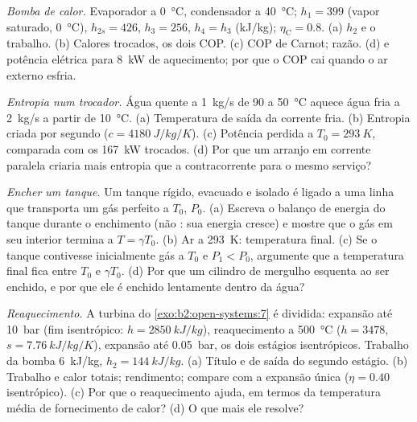 \begin{exercise}[$\star\star$]\label{exo:b2:open-systems:8}
\emph{Bomba de calor.} Evaporador a \qty{0}{\celsius}, condensador a \qty{40}{\celsius};
$h_1 = 399$ (vapor saturado, \qty{0}{\celsius}), $h_{2s} = 426$, $h_3 = 256$,
$h_4 = h_3$ (\unit{kJ/kg}); $\eta_{\text{C}} = 0.8$. (a) $h_2$ e o trabalho.
(b) Calores trocados, os dois COP. (c) COP de Carnot; razão. (d) 
e potência elétrica para \qty{8}{kW} de aquecimento; por que o COP cai quando
o ar externo esfria.
\end{exercise}

\begin{exercise}[$\star\star$]\label{exo:b2:open-systems:9}
\emph{Entropia num trocador.} Água quente a \qty{1}{kg/s} de \qty{90}{} a
\qty{50}{\celsius} aquece água fria a \qty{2}{kg/s} a partir de \qty{10}{\celsius}.
(a) Temperatura de saída da corrente fria. (b) Entropia criada por
segundo ($c = \qty{4180}{J/kg/K}$). (c) Potência perdida a $T_0 = \qty{293}{K}$,
comparada com os \qty{167}{kW} trocados. (d) Por que um arranjo em
corrente paralela criaria mais entropia que a contracorrente para o mesmo serviço?
\end{exercise}

\begin{exercise}[$\star\star\star$]\label{exo:b2:open-systems:10}
\emph{Encher um tanque.} Um tanque rígido, evacuado e isolado é ligado
a uma linha que transporta um gás perfeito a $T_0$, $P_0$. (a) Escreva o balanço
de energia do tanque durante o enchimento (não : sua energia cresce) e
mostre que o gás em seu interior termina a $T = \gamma T_0$. (b) Ar a \qty{293}{K}:
temperatura final. (c) Se o tanque contivesse inicialmente gás a $T_0$ e
$P_1 < P_0$, argumente que a temperatura final fica entre $T_0$ e
$\gamma T_0$. (d) Por que um cilindro de mergulho esquenta ao ser enchido, e por que
ele é enchido lentamente dentro da água?
\end{exercise}

\begin{exercise}[$\star\star\star$]\label{exo:b2:open-systems:11}
\emph{Reaquecimento.} A turbina do \cref{exo:b2:open-systems:7} é dividida:
expansão até \qty{10}{bar} (fim isentrópico: $h = \qty{2850}{kJ/kg}$), reaquecimento
a \qty{500}{\celsius} ($h = 3478$, $s = \qty{7.76}{kJ/kg/K}$), expansão até
\qty{0.05}{bar}, os dois estágios isentrópicos. Trabalho da bomba \qty{6}{kJ/kg}, $h_2 =
\qty{144}{kJ/kg}$. (a) Título e  de saída do segundo estágio. (b)
Trabalho e calor totais; rendimento; compare com a expansão única
($\eta = 0.40$ isentrópico). (c) Por que o reaquecimento ajuda, em termos da
temperatura média de fornecimento de calor? (d) O que mais ele resolve?
\end{exercise}

